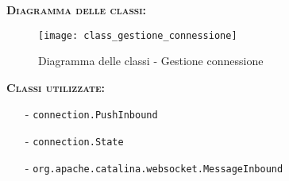 \begin{description}
	\item{\scshape\bfseries Diagramma delle classi:}
\begin{figure}[H]
  \centering
  \texttt{[image: class\_gestione\_connessione]}
  \caption{Diagramma delle classi - Gestione connessione}\label{fig:gestioneconnessione}
\end{figure}
	
	\item{\scshape\bfseries Classi utilizzate:}
	\begin{itemize}[nolistsep, noitemsep]
	  \item[-] \texttt{connection.PushInbound}
	  \item[-] \texttt{connection.State}
	  \item[-] \texttt{org.apache.catalina.websocket.MessageInbound}
	\end{itemize}
\end{description}


